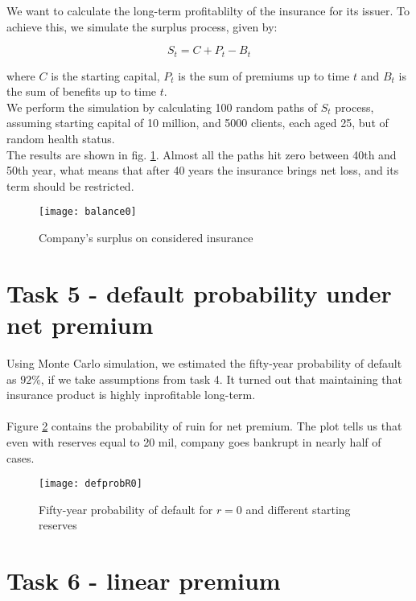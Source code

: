 \documentclass[11pt,wide]{mwart}
\begin{document}
We want to calculate the long-term profitablilty of the insurance for its issuer. To achieve this, we simulate the surplus process, given by:

$$S_t = C + P_t  - B_t $$

where $C$ is the starting capital, $P_t$ is the sum of premiums up to time $t$ and $B_t$ is the sum of benefits up to time $t$. \\
We perform the simulation by calculating 100 random paths of $S_t$ process, assuming starting capital of 10 million, and 5000 clients, each aged 25, but of random health status. \\
The results are shown in fig. \ref{balance0}. Almost all the paths hit zero between 40th and 50th year, what means that after 40 years the insurance brings net loss, and its term should be restricted.

\begin{figure}[!htbp]
	\caption{Company's surplus on considered insurance}
	\label{balance0}
	\texttt{[image: balance0]}
	\centering
\end{figure}

\newpage

\section{Task 5 - default probability under net premium}

Using Monte Carlo simulation, we estimated the fifty-year probability of default as $92\%$, if we take assumptions from task 4. It turned out that maintaining that insurance product is highly inprofitable long-term.\\\\
Figure \ref{defprobR0} contains the probability of ruin for net premium. The plot tells us that even with reserves equal to 20 mil, company goes bankrupt in nearly half of cases.

\begin{figure}[!htbp]
	\caption{Fifty-year probability of default for $r = 0$ and different starting reserves}
	\label{defprobR0}
	\texttt{[image: defprobR0]}
	\centering
\end{figure}


\section{Task 6 - linear premium}
\end{document}
